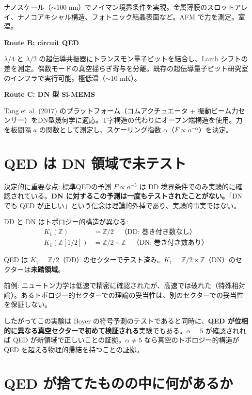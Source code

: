 \documentclass[11pt,a4paper]{article}
\begin{document}
ナノスケール（$\sim 100$ nm）でノイマン境界条件を実現。金属薄膜のスロットアレイ、ナノコアキシャル構造、フォトニック結晶表面など。AFM で力を測定。室温。

\textbf{Route B: circuit QED}

$\lambda/4$ と $\lambda/2$ の超伝導共振器にトランスモン量子ビットを結合し、Lamb シフトの差を測定。偶数モードの真空揺らぎ寄与を分離。既存の超伝導量子ビット研究室のインフラで実行可能。極低温（$\sim 10$ mK）。

\textbf{Route C: DN 型 Si-MEMS}

Tang et al. (2017) のプラットフォーム（コムアクチュエータ + 振動ビーム力センサー）をDN型幾何学に適応。T字構造の代わりにオープン端構造を使用。力を板間隔 $a$ の関数として測定し、スケーリング指数 $\alpha$（$F \propto a^{-\alpha}$）を決定。

\section{QED は DN 領域で未テスト}

決定的に重要な点: 標準QEDの予測 $F \propto a^{-5}$ は DD 境界条件でのみ実験的に確認されている。\textbf{DN に対するこの予測は一度もテストされたことがない。}「DN でも QED が正しい」という信念は理論的外挿であり、実験的事実ではない。

DD と DN はトポロジー的構造が異なる:
\begin{align}
K_1(\mathbb{Z}) &= \mathbb{Z}/2 \quad\text{（DD: 巻き付き数なし）}\\
K_1(\mathbb{Z}[1/2]) &= \mathbb{Z}/2 \times \mathbb{Z} \quad\text{（DN: 巻き付き数あり）}
\end{align}

QED は $K_1 = \mathbb{Z}/2$（DD）のセクターでテスト済み。$K_1 = \mathbb{Z}/2 \times \mathbb{Z}$（DN）のセクターは\textbf{未踏領域}。

前例: ニュートン力学は低速で精密に確認されたが、高速では破れた（特殊相対論）。あるトポロジー的セクターでの理論の妥当性は、別のセクターでの妥当性を保証しない。

したがってこの実験は Boyer の符号予測のテストであると同時に、\textbf{QED が位相的に異なる真空セクターで初めて検証される}実験でもある。$\alpha = 5$ が確認されれば QED が新領域で正しいことの証拠。$\alpha \neq 5$ なら真空のトポロジー的構造が QED を超える物理的帰結を持つことの証拠。

\section{QED が捨てたものの中に何があるか}
\end{document}
